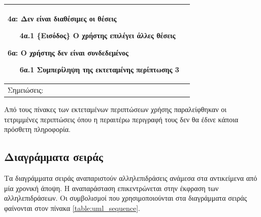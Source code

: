 \documentclass{assignment}
\begin{document}
\begin{longtable}{| p{3.5cm} | p{9cm} |}
4α: Δεν είναι διαθέσιμες οι θέσεις
\begin{enumerate}
\item [4α.1] \{Εισόδος\} Ο χρήστης επιλέγει άλλες θέσεις
\end{enumerate}

6α: Ο χρήστης δεν είναι συνδεδεμένος
\begin{enumerate}
\item [6α.1] Συμπερίληψη της εκτεταμένης περίπτωσης 3
\end{enumerate}\\

\hline
Σημειώσεις: &\\
\hline
\end{longtable}

Από τους πίνακες των εκτεταμένων περιπτώσεων χρήσης παραλείφθηκαν οι τετριμμένες περιπτώσεις όπου η περαιτέρω περιγραφή τους δεν θα έδινε κάποια πρόσθετη πληροφορία.

\subsection{Διαγράμματα σειράς}

Τα διαγράμματα σειράς αναπαριστούν αλληλεπιδράσεις ανάμεσα στα αντικείμενα από μία χρονική άποψη. Η αναπαράσταση επικεντρώνεται στην έκφραση των αλληλεπιδράσεων. Οι συμβολισμοί που χρησιμοποιούνται στα διαγράμματα σειράς φαίνονται στον πίνακα \ref{table:uml_sequence}.
\end{document}
